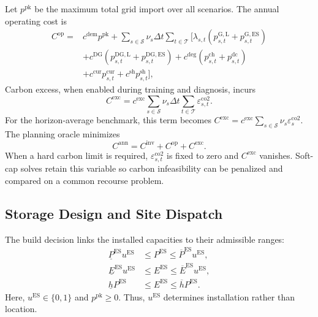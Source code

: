 \documentclass[times]{elsarticle}
\begin{document}
Let $p^{\mathrm{pk}}$ be the maximum total grid import over all scenarios. The
annual operating cost is
\begin{align}
C^{\mathrm{op}}={}&c^{\mathrm{dem}}p^{\mathrm{pk}}
+\sum_{s\in\mathcal S}\nu_s\Delta t\sum_{t\in\mathcal T}\big[
\lambda_{s,t}(p^{\mathrm{G},\mathrm L}_{s,t}
+p^{\mathrm{G},\mathrm{ES}}_{s,t})
\nonumber\\
&+c^{\mathrm{DG}}(p^{\mathrm{DG},\mathrm L}_{s,t}
+p^{\mathrm{DG},\mathrm{ES}}_{s,t})
+c^{\mathrm{deg}}(p^{\mathrm{ch}}_{s,t}+p^{\mathrm{dc}}_{s,t})
\nonumber\\
&+c^{\mathrm{cur}}p^{\mathrm{cur}}_{s,t}
+c^{\mathrm{sh}}p^{\mathrm{sh}}_{s,t}\big],
\label{eq:operating_cost}
\end{align}
Carbon excess, when enabled during training and diagnosis, incurs
\begin{equation}
C^{\mathrm{exc}}=
c^{\mathrm{exc}}\sum_{s\in\mathcal S}\nu_s\Delta t
\sum_{t\in\mathcal T}\varepsilon^{\mathrm{co2}}_{s,t}.
\label{eq:carbon_excess_cost}
\end{equation}
For the horizon-average benchmark, this term becomes
$C^{\mathrm{exc}}=c^{\mathrm{exc}}
\sum_{s\in\mathcal S}\nu_s\varepsilon^{\mathrm{co2}}_s$.
The planning oracle minimizes
\begin{equation}
C^{\mathrm{ann}}=C^{\mathrm{inv}}+C^{\mathrm{op}}+C^{\mathrm{exc}}.
\label{eq:annual_cost}
\end{equation}
When a hard carbon limit is required,
$\varepsilon^{\mathrm{co2}}_{s,t}$ is fixed to zero and $C^{\mathrm{exc}}$
vanishes. Soft-cap solves retain this variable so carbon infeasibility can be
penalized and compared on a common recourse problem.

\subsection{Storage Design and Site Dispatch}

The build decision links the installed capacities to their admissible ranges:
\begin{align}
\underline P^{\mathrm{ES}}u^{\mathrm{ES}}&\le P^{\mathrm{ES}}
\le\overline P^{\mathrm{ES}}u^{\mathrm{ES}},
\label{eq:power_cap}\\
\underline E^{\mathrm{ES}}u^{\mathrm{ES}}&\le E^{\mathrm{ES}}
\le\overline E^{\mathrm{ES}}u^{\mathrm{ES}},
\label{eq:energy_cap}\\
\underline h P^{\mathrm{ES}}&\le E^{\mathrm{ES}}
\le\overline h P^{\mathrm{ES}}.
\label{eq:duration}
\end{align}
Here, $u^{\mathrm{ES}}\in\{0,1\}$ and $p^{\mathrm{pk}}\ge0$. Thus,
$u^{\mathrm{ES}}$ determines
installation rather than location.
\end{document}
